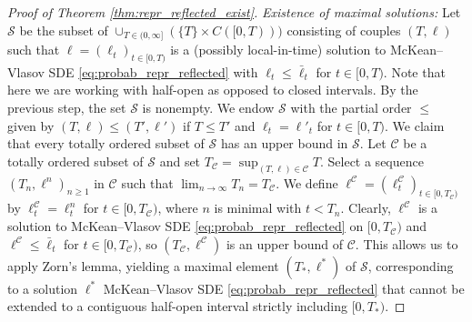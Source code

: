 \documentclass[11pt, a4paper]{article}
\theoremstyle{plain}
\theoremstyle{definition}
\theoremstyle{remark}
\numberwithin{equation}{section}
\renewcommand{\cal}[1]{\mathcal{#1}}
\begin{document}
\begin{proof}[Proof of Theorem \ref{thm:repr_reflected_exist}]
\textit{Existence of maximal solutions:} Let $\cal{S}$ be the subset of $\cup_{T \in (0, \infty]} (\{T\} \times C([0, T)))$ consisting of couples $(T, \ell)$ such that $\ell = (\ell_t)_{t \in [0, T)}$ is a (possibly local-in-time) solution to McKean--Vlasov SDE \eqref{eq:probab_repr_reflected} with $\ell_t \leq \bar{\ell}_t$ for $t \in [0, T)$. Note that here we are working with half-open as opposed to closed intervals. By the previous step, the set $\cal{S}$ is nonempty. We endow $\cal{S}$ with the partial order $\leq$ given by $(T, \ell) \leq (T', \ell')$ if $T \leq T'$ and $\ell_t = \ell'_t$ for $t \in [0, T)$. We claim that every totally ordered subset of $\cal{S}$ has an upper bound in $\cal{S}$. Let $\cal{C}$ be a totally ordered subset of $\cal{S}$ and set $T_{\cal{C}} = \sup_{(T, \ell) \in \cal{C}} T$. Select a sequence $(T_n, \ell^n)_{n \geq 1}$ in $\cal{C}$ such that $\lim_{n \to \infty} T_n = T_{\cal{C}}$. We define $\ell^{\cal{C}} = (\ell^{\cal{C}}_t)_{t \in [0, T_{\cal{C}})}$ by $\ell^{\cal{C}}_t = \ell^n_t$ for $t \in [0, T_{\cal{C}})$, where $n$ is minimal with $t < T_n$. Clearly, $\ell^{\cal{C}}$ is a solution to McKean--Vlasov SDE \eqref{eq:probab_repr_reflected} on $[0, T_{\cal{C}})$ and $\ell^{\cal{C}} \leq \bar{\ell}_t$ for $t \in [0, T_{\cal{C}})$, so $(T_{\cal{C}}, \ell^\cal{C})$ is an upper bound of $\cal{C}$. This allows us to apply Zorn's lemma, yielding a maximal element $(T_{\ast}, \ell^{\ast})$ of $\cal{S}$, corresponding to a solution $\ell^{\ast}$ McKean--Vlasov SDE \eqref{eq:probab_repr_reflected} that cannot be extended to a contiguous half-open interval strictly including $[0, T_{\ast})$. 


\end{proof}
\end{document}
